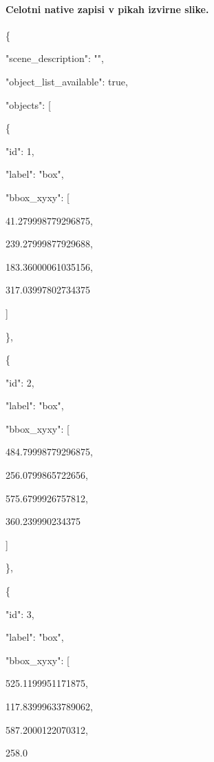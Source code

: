 \documentclass[10pt,a4paper]{article}
\begin{document}
\paragraph{Celotni native zapisi v pikah izvirne slike.}
\{\par
  "scene\_description":\allowbreak{} "",\allowbreak{}\par
  "object\_list\_available":\allowbreak{} true,\allowbreak{}\par
  "objects":\allowbreak{} [\par
    \{\par
      "id":\allowbreak{} 1,\allowbreak{}\par
      "label":\allowbreak{} "box",\allowbreak{}\par
      "bbox\_xyxy":\allowbreak{} [\par
        41.279998779296875,\allowbreak{}\par
        239.27999877929688,\allowbreak{}\par
        183.36000061035156,\allowbreak{}\par
        317.03997802734375\par
      ]\par
    \},\allowbreak{}\par
    \{\par
      "id":\allowbreak{} 2,\allowbreak{}\par
      "label":\allowbreak{} "box",\allowbreak{}\par
      "bbox\_xyxy":\allowbreak{} [\par
        484.79998779296875,\allowbreak{}\par
        256.0799865722656,\allowbreak{}\par
        575.6799926757812,\allowbreak{}\par
        360.239990234375\par
      ]\par
    \},\allowbreak{}\par
    \{\par
      "id":\allowbreak{} 3,\allowbreak{}\par
      "label":\allowbreak{} "box",\allowbreak{}\par
      "bbox\_xyxy":\allowbreak{} [\par
        525.1199951171875,\allowbreak{}\par
        117.83999633789062,\allowbreak{}\par
        587.2000122070312,\allowbreak{}\par
        258.0\par
\end{document}
